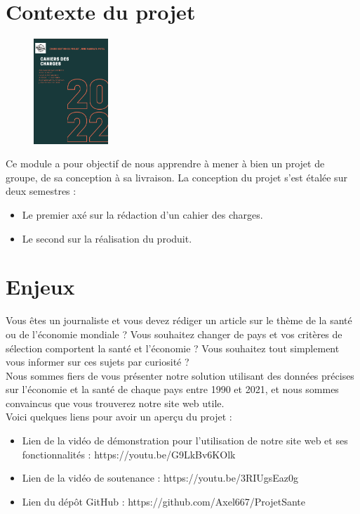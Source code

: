 \documentclass[12pt,a4paper]{report}
\begin{document}
\section{Contexte du projet}
\begin{figure}
    \vspace{-2.5em} %
    \includegraphics[width=0.25\textwidth]{images/image_cahier_charge.png}
\end{figure}
Ce module a pour objectif de nous apprendre à mener à bien un projet de groupe, de sa conception à sa livraison. La conception du projet s'est étalée sur deux semestres :

\begin{itemize}
\item Le premier axé sur la rédaction d'un cahier des charges.
\item Le second sur la réalisation du produit.
\end{itemize}

\section{Enjeux}
Vous êtes un journaliste et vous devez rédiger un article sur le thème de la santé ou de l'économie mondiale ? Vous souhaitez changer de pays et vos critères de sélection comportent la santé et l'économie ? Vous souhaitez tout simplement vous informer sur ces sujets par curiosité ? \\

Nous sommes fiers de vous présenter notre solution utilisant des données précises sur l'économie et la santé de chaque pays entre 1990 et 2021, et nous sommes convaincus que vous trouverez notre site web utile. \\

Voici quelques liens pour avoir un aperçu du projet :

\begin{itemize}
\item Lien de la vidéo de démonstration pour l'utilisation de notre site web et ses fonctionnalités : https://youtu.be/G9LkBv6KOlk
\item Lien de la vidéo de soutenance : https://youtu.be/3RIUgsEaz0g
\item Lien du dépôt GitHub : https://github.com/Axel667/ProjetSante \\
\end{itemize}
\end{document}

